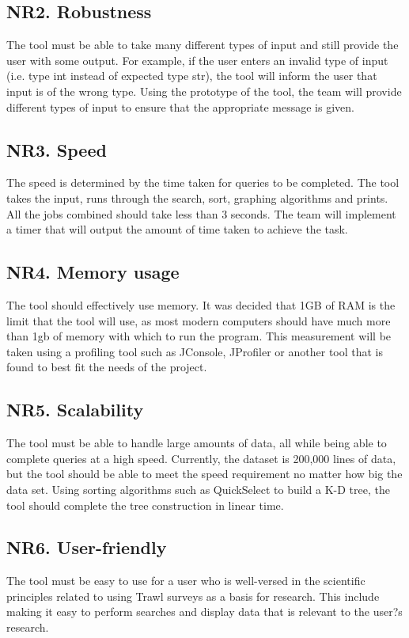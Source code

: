\documentclass{article}
\begin{document}
\subsection{NR2. Robustness}
The tool must be able to take many different types of input and still provide the user with some output. For example, if the user enters an invalid type of input (i.e. type int instead of expected type str), the tool will inform the user that input is of the wrong type. Using the prototype of the tool, the team will provide different types of input to ensure that the appropriate message is given.

\subsection{NR3. Speed}
The speed is determined by the time taken for queries to be completed. The tool takes the input, runs through the search, sort, graphing algorithms and prints. All the jobs combined should take less than 3 seconds. The team will implement a timer that will output the amount of time taken to achieve the task.

\subsection{NR4. Memory usage}
The tool should effectively use memory. It was decided that 1GB of RAM is the limit that the tool will use, as most modern computers should have much more than 1gb of memory with which to run the program. This measurement will be taken using a profiling tool such as JConsole, JProfiler or another tool that is found to best fit the needs of the project.

\subsection{NR5. Scalability}
The tool must be able to handle large amounts of data, all while being able to complete queries at a high speed. Currently, the dataset is 200,000 lines of data, but the tool should be able to meet the speed requirement no matter how big the data set. Using sorting algorithms such as QuickSelect to build a K-D tree, the tool should complete the tree construction in linear time.

\subsection{NR6. User-friendly}
The tool must be easy to use for a user who is well-versed in the scientific principles related to using Trawl surveys as a basis for research. This include making it easy to perform searches and display data that is relevant to the user?s research.
\end{document}
